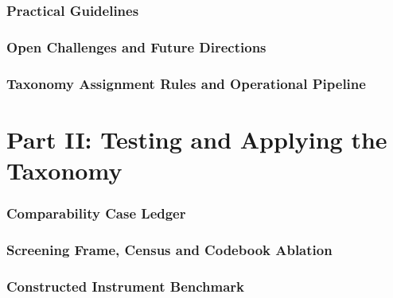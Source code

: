 \documentclass[11pt]{article}
\begin{document}
\FloatBarrier
\section{Practical Guidelines}
\label{app:guidelines}


\FloatBarrier
\section{Open Challenges and Future Directions}
\label{app:challenges}


\FloatBarrier
\section{Taxonomy Assignment Rules and Operational Pipeline}
\label{sec:appendix-methods}





\part*{Part II: Testing and Applying the Taxonomy}
\label{app:part-audit}

\FloatBarrier
\section{Comparability Case Ledger}
\label{sec:appendix-cases}
\label{sec:cases}



\FloatBarrier
\section{Screening Frame, Census and Codebook Ablation}
\label{sec:appendix-census}
















\FloatBarrier
\section{Constructed Instrument Benchmark}
\label{sec:appendix-instrument}



\end{document}
